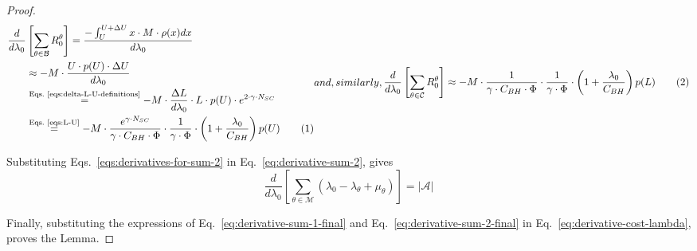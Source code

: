 \documentclass[10pt,conference,letterpaper]{IEEEtran}
\newcommand{\eq}[1]{Eq.~\eqref{#1}}
\newcommand{\eqs}[1]{Eqs.~\eqref{#1}}
\newcommand\numberthis{\addtocounter{equation}{1}\tag{\theequation}}
\begin{document}
\begin{proof}
\begin{subequations}
\begin{align*}
 \frac{d}{d\lambda_{0}}&\left[\sum_{\theta\in\mathcal{B}}R_{0}^{\theta}\right] = \frac{-\int_{U}^{U+\Delta U}x\cdot M\cdot \rho(x)dx}{d\lambda_{0}}\\
	&\approx -M\cdot \frac{U\cdot p(U)\cdot \Delta U}{d\lambda_{0}}\\
	&\stackrel{\text{\eqs{eqs:delta-L-U-definitions}}}{=} -M\cdot \frac{\Delta L}{d\lambda_{0}}\cdot L\cdot p(U)\cdot e^{2\cdot \gamma\cdot N_{SC}}\\
	&\stackrel{\text{\eqs{eqs:L-U}}}{=} -M\cdot \frac{e^{\gamma\cdot N_{SC}}}{\gamma\cdot  C_{BH}\cdot\Phi}\cdot \frac{1}{\gamma\cdot\Phi} \cdot \left(1+\frac{\lambda_{0}}{C_{BH}}\right)p(U)\numberthis
\end{align*}
and, similarly, 
\begin{align*}
 \frac{d}{d\lambda_{0}}\left[\sum_{\theta\in\mathcal{C}}R_{0}^{\theta}\right] \approx -M\cdot \frac{1}{\gamma\cdot  C_{BH}\cdot\Phi}\cdot \frac{1}{\gamma\cdot\Phi} \cdot \left(1+\frac{\lambda_{0}}{C_{BH}}\right)p(L)\numberthis
\end{align*}
\end{subequations}

Substituting \eqs{eqs:derivatives-for-sum-2} in \eq{eq:derivative-sum-2}, gives 
\begin{equation}\label{eq:derivative-sum-2-final}
 \frac{d}{d\lambda_{0}} \left[\sum_{\theta\in\mathcal{M}}\left( \lambda_{0}-\lambda_{\theta}+\mu_{\theta}\right )\right] = |\mathcal{A}|
\end{equation}

Finally, substituting the expressions of \eq{eq:derivative-sum-1-final} and \eq{eq:derivative-sum-2-final} in \eq{eq:derivative-cost-lambda}, proves the Lemma.
\end{proof}
\end{document}
